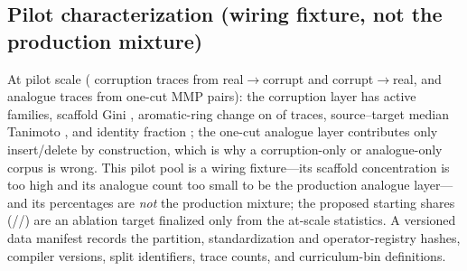 \subsection{Pilot characterization (wiring fixture, not the production mixture)}
At pilot scale ( corruption traces from real$\to$corrupt and
corrupt$\to$real, and  analogue traces from
 one-cut MMP pairs): the corruption layer has
 active families, scaffold Gini
, aromatic-ring change on
 of traces, source--target median Tanimoto
, and identity fraction
; the one-cut analogue layer contributes only insert/delete by
construction, which is why a corruption-only or analogue-only corpus is wrong. This pilot pool is a wiring
fixture---its scaffold concentration is too high and its analogue count too small to be the production
analogue layer---and its percentages are \emph{not} the production mixture; the proposed starting shares
(//) are an
ablation target finalized only from the at-scale statistics. A versioned data manifest records the
partition, standardization and operator-registry hashes, compiler versions, split identifiers, trace
counts, and curriculum-bin definitions.

